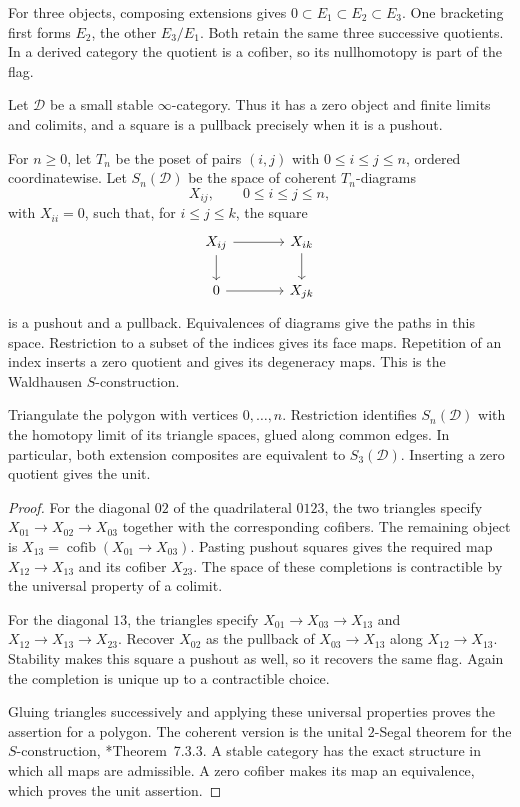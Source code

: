 For three objects, composing extensions gives
$0\subset E_1\subset E_2\subset E_3$.
One bracketing first forms $E_2$, the other $E_3/E_1$.
Both retain the same three successive quotients.
In a derived category the quotient is a cofiber, so its nullhomotopy
is part of the flag.

Let $\mathcal D$ be a small stable $\infty$-category.
Thus it has a zero object and finite limits and colimits, and a
square is a pullback precisely when it is a pushout.

For $n\geq0$, let $T_n$ be the poset of pairs $(i,j)$ with
$0\leq i\leq j\leq n$, ordered coordinatewise.
Let $S_n(\mathcal D)$ be the space of coherent $T_n$-diagrams
\[
               X_{ij},\qquad 0\leq i\leq j\leq n,
\]
with $X_{ii}=0$, such that, for $i\leq j\leq k$, the square
\[
 \begin{tikzcd}[column sep=large]
 X_{ij}\ar[r]\ar[d]&X_{ik}\ar[d]\\
 0\ar[r]&X_{jk}
 \end{tikzcd}
\]
is a pushout and a pullback.
Equivalences of diagrams give the paths in this space.
Restriction to a subset of the indices gives its face maps.
Repetition of an index inserts a zero quotient and gives its
degeneracy maps. This is the Waldhausen $S$-construction.

\begin{proposition}
\label{cyhall:prop:two-segal}
Triangulate the polygon with vertices $0,\ldots,n$.
Restriction identifies $S_n(\mathcal D)$ with the homotopy limit
of its triangle spaces, glued along common edges.
In particular, both extension composites are equivalent
to $S_3(\mathcal D)$. Inserting a zero quotient gives the unit.
\end{proposition}
\begin{proof}
For the diagonal $02$ of the quadrilateral $0123$, the two
triangles specify $X_{01}\to X_{02}\to X_{03}$ together with
the corresponding cofibers. The remaining object is
$X_{13}=\operatorname{cofib}(X_{01}\to X_{03})$.
Pasting pushout squares gives the required map
$X_{12}\to X_{13}$ and its cofiber $X_{23}$.
The space of these completions is contractible by the universal
property of a colimit.

For the diagonal $13$, the triangles specify
$X_{01}\to X_{03}\to X_{13}$ and
$X_{12}\to X_{13}\to X_{23}$.
Recover $X_{02}$ as the pullback of $X_{03}\to X_{13}$ along
$X_{12}\to X_{13}$. Stability makes this square a pushout as well,
so it recovers the same flag.
Again the completion is unique up to a contractible choice.

Gluing triangles successively and applying these universal
properties proves the assertion for a polygon.
The coherent version is the unital $2$-Segal theorem for the
$S$-construction, \cite{cyhall:DK}*{Theorem~7.3.3}.
A stable category has the exact structure in which all maps
are admissible.
A zero cofiber makes its map an equivalence, which proves the
unit assertion.
\end{proof}

